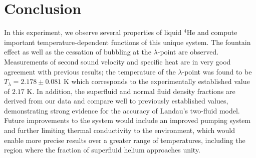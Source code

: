 
\section{Conclusion}\label{conclusion}

In this experiment, we observe several properties of liquid $^4$He and
compute important temperature-dependent functions of this unique
system. The fountain effect as well as the cessation of
bubbling at the $\lambda$-point are observed. Measurements of second sound
velocity and specific heat are in very good agreement with previous
results; the temperature of the $\lambda$-point was found to be
$T_{\lambda} = 2.178 \pm 0.081$ K which corresponds to the
experimentally established value of $2.17$ K. In addition, the
superfluid and normal fluid density fractions are derived from our
data and compare well to previously established values, demonstrating strong evidence for the accuracy of Landau's two-fluid model. Future
improvements to the system would include an improved pumping system
and further limiting thermal conductivity to the environment, which
would enable more precise results over a greater range of
temperatures, including the region where the fraction of superfluid helium approaches unity.


